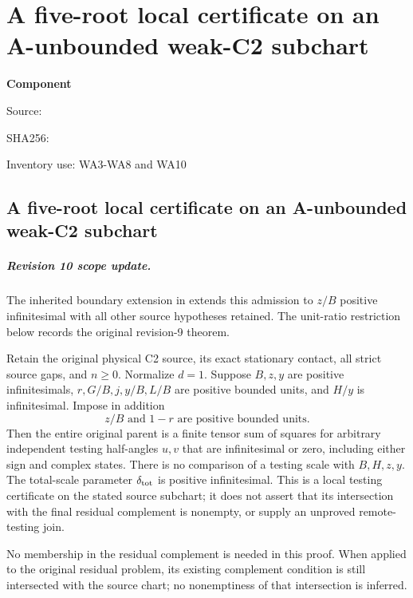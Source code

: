 \chapter{A five-root local certificate on an A-unbounded weak-C2 subchart}
\label{component:p9ec3d6bbd717}
\noindent\textbf{Component }\par
{\small\noindent Source: \par}
{\small\noindent SHA256: \par}
{\small\noindent Inventory use: WA3-WA8 and WA10\par}
\medskip
\section{A five-root local certificate on an A-unbounded weak-C2 subchart}
\label{p9ec3d6bbd717:sec:r9-weak-A-five-root}

\paragraph{Revision 10 scope update.}
The inherited boundary extension in  extends this admission to $z/B$
positive infinitesimal with all other source hypotheses retained.
The unit-ratio restriction below records the original revision-9 theorem.

\begin{theorem}
Retain the original physical C2 source, its exact stationary contact,
all strict source gaps, and $n\ge0$.
Normalize $d=1$. Suppose $B,z,y$ are positive infinitesimals,
$r,G/B,j,y/B,L/B$ are positive bounded units, and $H/y$ is
infinitesimal. Impose in addition
\[
 z/B\text{ and }1-r\text{ are positive bounded units}.       \tag{WA1}
\]
Then the entire original parent is a finite tensor sum of squares
for arbitrary independent testing half-angles $u,v$ that are
infinitesimal or zero, including either sign and complex states.
There is no comparison of a testing scale with $B,H,z,y$.
The total-scale parameter $\delta_{\rm tot}$ is positive infinitesimal.
This is a local testing certificate on the stated source subchart;
it does not assert that its intersection with the final residual
complement is nonempty, or supply an unproved remote-testing join.
\end{theorem}

No membership in the residual complement is needed in this proof.
When applied to the original residual problem, its existing complement
condition is still intersected with the source chart; no nonemptiness
of that intersection is inferred.

